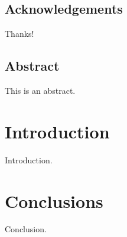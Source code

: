 \documentclass[oneside,letterpaper]{memoir}
\begin{document}
\frontmatter

\thetitlepage
\copyrightpage

\section*{Acknowledgements}
Thanks!

\newpage
\section*{Abstract}

This is an abstract.

\newpage
\tableofcontents
\listoftables
\listoffigures

\mainmatter

\chapter{Introduction}
Introduction.

\chapter{Conclusions}
Conclusion.

\backmatter
\end{document}
